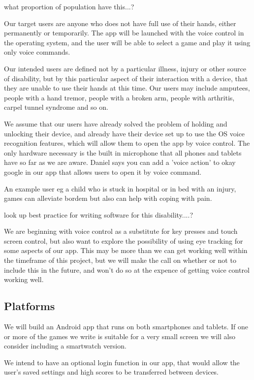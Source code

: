 \documentclass[11pt, oneside]{article}
\begin{document}
what proportion of population have this...?


Our target users are anyone who does not have full use of their hands,
either permanently or temporarily. The app will be launched with the
voice control in the operating system, and the user will be able to
select a game and play it using only voice commands. 

Our intended users are defined not by a particular illness, injury or
other source of disability, but by this particular aspect of their
interaction with a device, that they are unable to use their hands at
this time. Our users may include amputees, people with a hand tremor,
people with a broken arm, people with arthritis, carpel tunnel
syndrome and so on.

We assume that our users have already solved the problem of holding
and unlocking their device, and already have their device set up to
use the OS voice recognition features, which will allow them to open
the app by voice control.  The only hardware necessary is the built in
microphone that all phones and tablets have so far as we are aware.
Daniel says you can add a 'voice action' to okay google in our app
that allows users to open it by voice command.

An example user eg a child who is stuck in hospital or in bed with an
injury, games can alleviate bordem but also can help with coping with
pain.

look up best practice for writing software for this disability....?

We are beginning with voice control as a substitute for key presses
and touch screen control, but also want to explore the possibility of
using eye tracking for some aspects of our app. This may be more than
we can get working well within the timeframe of this project, but we
will make the call on whether or not to include this in the future,
and won't do so at the expence of getting voice control working well.


\subsection*{Platforms}

We will build an Android app that runs on both smartphones and
tablets. If one or more of the games we write is suitable for a very
small screen we will also consider including a smartwatch version.

We intend to have an optional login function in our app, that would
allow the user's saved settings and high scores to be transferred between
devices.
\end{document}
